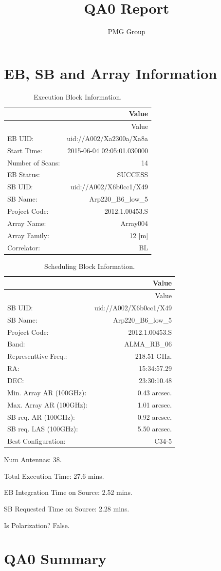 \documentclass[10pt,]{article}
\title{QA0 Report}
\author{PMG Group}
\date{}
\begin{document}
\maketitle


\section{EB, SB and Array
Information}\label{eb-sb-and-array-information}

\begin{longtable}[c]{@{}lr@{}}
\caption{Execution Block Information.}\tabularnewline
\toprule
& Value\tabularnewline
\midrule
\endfirsthead
\toprule
& Value\tabularnewline
\midrule
\endhead
EB UID: & uid://A002/Xa2300a/Xa8a\tabularnewline
Start Time: & 2015-06-04 02:05:01.030000\tabularnewline
Number of Scans: & 14\tabularnewline
EB Status: & SUCCESS\tabularnewline
SB UID: & uid://A002/X6b0cc1/X49\tabularnewline
SB Name: & Arp220\_B6\_low\_5\tabularnewline
Project Code: & 2012.1.00453.S\tabularnewline
Array Name: & Array004\tabularnewline
Array Family: & 12 {[}m{]}\tabularnewline
Correlator: & BL\tabularnewline
\bottomrule
\end{longtable}

\begin{longtable}[c]{@{}lr@{}}
\caption{Scheduling Block Information.}\tabularnewline
\toprule
& Value\tabularnewline
\midrule
\endfirsthead
\toprule
& Value\tabularnewline
\midrule
\endhead
SB UID: & uid://A002/X6b0cc1/X49\tabularnewline
SB Name: & Arp220\_B6\_low\_5\tabularnewline
Project Code: & 2012.1.00453.S\tabularnewline
Band: & ALMA\_RB\_06\tabularnewline
Representtive Freq.: & 218.51 GHz.\tabularnewline
RA: & 15:34:57.29\tabularnewline
DEC: & 23:30:10.48\tabularnewline
Min. Array AR (100GHz): & 0.43 arcsec.\tabularnewline
Max. Array AR (100GHz): & 1.01 arcsec.\tabularnewline
SB req. AR (100GHz): & 0.92 arcsec.\tabularnewline
SB req. LAS (100GHz): & 5.50 arcsec.\tabularnewline
Best Configuration: & C34-5\tabularnewline
\bottomrule
\end{longtable}

Num Antennas: 38.

Total Execution Time: 27.6 mins.

EB Integration Time on Source: 2.52 mins.

SB Requested Time on Source: 2.28 mins.

Is Polarization? False.

\pagebreak

\section{QA0 Summary}\label{qa0-summary}
\end{document}
